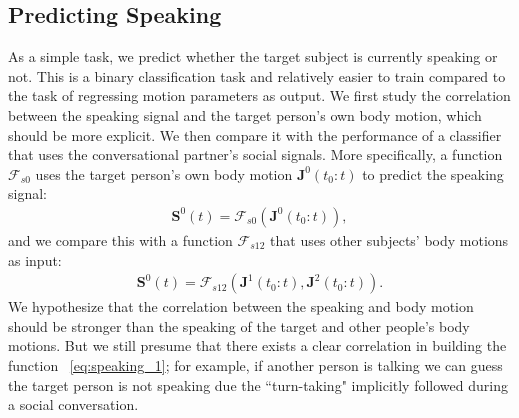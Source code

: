 \subsection{Predicting Speaking}
As a simple task, we predict whether the target subject is currently speaking or not. This is a binary classification task and relatively easier to train compared to the task of regressing motion parameters as output. We first study the correlation between the speaking signal and the target person's own body motion, which should be more explicit. We then compare it with the performance of a classifier that uses the conversational partner's social signals. More specifically, a function $\mathcal{F}_{s0}$ uses the target person's own body motion $\mathbf{J}^0(t_0:t)$ to predict the speaking signal:
\begin{gather}	
\mathbf{S}^0(t) = \mathcal{F}_{s0} \left( \mathbf{J}^0(t_0:t) \right),
\label{eq:speaking_0}
\end{gather}
and we compare this with a function $\mathcal{F}_{s12}$ that uses other subjects' body motions as input:
\begin{gather}	
\mathbf{S}^0(t) = \mathcal{F}_{s12} \left( \mathbf{J}^1(t_0:t), \mathbf{J}^2(t_0:t) \right).
\label{eq:speaking_1}
\end{gather}
We hypothesize that the correlation between the speaking and body motion should be stronger than the speaking of the target and other people's body motions. But we still presume that there exists a clear correlation in building the function ~\ref{eq:speaking_1}; for example, if another person is talking we can guess the target person is not speaking due the ``turn-taking" implicitly followed during a social conversation. %

